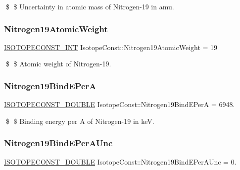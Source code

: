 \$ \$ Uncertainty in atomic mass of Nitrogen-\/19 in amu. \mbox{\label{group___isotope_const-_nitrogen-_n19_gaa1d1fb4146b584a1e9fdbfc581a50eb2}} 
\subsubsection{\texorpdfstring{Nitrogen19\+Atomic\+Weight}{Nitrogen19AtomicWeight}}
{\footnotesize\ttfamily \mbox{\hyperlink{group___isotope_const-_macros_ga5f18360b3e99483a35c32d789e62621c}{I\+S\+O\+T\+O\+P\+E\+C\+O\+N\+S\+T\+\_\+\+I\+NT}} Isotope\+Const\+::\+Nitrogen19\+Atomic\+Weight = 19}

\$ \$ Atomic weight of Nitrogen-\/19. \mbox{\label{group___isotope_const-_nitrogen-_n19_gaca4c324d5c01c1467ce7349fbf6da825}} 
\subsubsection{\texorpdfstring{Nitrogen19\+Bind\+E\+PerA}{Nitrogen19BindEPerA}}
{\footnotesize\ttfamily \mbox{\hyperlink{group___isotope_const-_macros_ga8f45a7272ce02c0b4c65c44636ed719a}{I\+S\+O\+T\+O\+P\+E\+C\+O\+N\+S\+T\+\_\+\+D\+O\+U\+B\+LE}} Isotope\+Const\+::\+Nitrogen19\+Bind\+E\+PerA = 6948.}

\$ \$ Binding energy per A of Nitrogen-\/19 in keV. \mbox{\label{group___isotope_const-_nitrogen-_n19_ga025f8a1cde368dae5388214e2f9a083e}} 
\subsubsection{\texorpdfstring{Nitrogen19\+Bind\+E\+Per\+A\+Unc}{Nitrogen19BindEPerAUnc}}
{\footnotesize\ttfamily \mbox{\hyperlink{group___isotope_const-_macros_ga8f45a7272ce02c0b4c65c44636ed719a}{I\+S\+O\+T\+O\+P\+E\+C\+O\+N\+S\+T\+\_\+\+D\+O\+U\+B\+LE}} Isotope\+Const\+::\+Nitrogen19\+Bind\+E\+Per\+A\+Unc = 0.}

